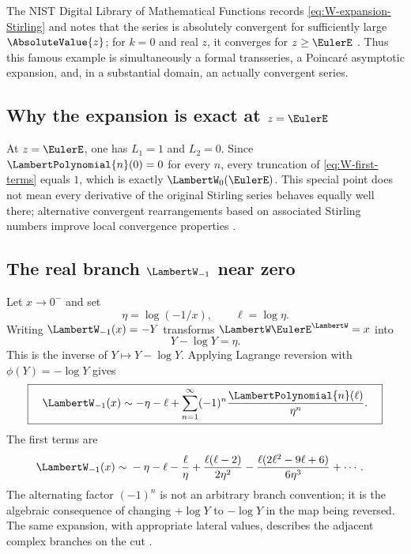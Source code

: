 \documentclass[11pt]{article}
\theoremstyle{pltheorem}
\begin{document}
The NIST Digital Library of Mathematical Functions records
\cref{eq:W-expansion-Stirling} and notes that the series is absolutely convergent for sufficiently large \(\AbsoluteValue{z}\); for \(k=0\) and real \(z\), it converges for \(z\ge\EulerE\) \cite{dlmf-W}.  Thus this famous example is simultaneously a formal transseries, a Poincar\'e asymptotic expansion, and, in a substantial domain, an actually convergent series.

\subsection{\texorpdfstring{Why the expansion is exact at \(z=\EulerE\)}{Why the expansion is exact at z = e}}

At \(z=\EulerE\), one has \(L_1=1\) and \(L_2=0\).  Since
\(\LambertPolynomial{n}(0)=0\) for every \(n\), every truncation of
\cref{eq:W-first-terms} equals \(1\), which is exactly
\(\LambertW_0(\EulerE)\).  This special point does not mean every derivative of the original Stirling series behaves equally well there; alternative convergent rearrangements based on associated Stirling numbers improve local convergence properties \cite{jeffrey-et-al-1995}.

\subsection{\texorpdfstring{The real branch \(\LambertW_{-1}\) near zero}{The real branch W-1 near zero}}

Let \(x\to0^-\) and set
\begin{equation}\label{eq:eta-def}
 \eta=\log(-1/x),
 \qquad
 \ell=\log\eta.
\end{equation}
Writing \(\LambertW_{-1}(x)=-Y\) transforms
\(\LambertW\EulerE^\LambertW=x\) into
\begin{equation}\label{eq:Y-minus-logY}
 Y-\log Y=\eta.
\end{equation}
This is the inverse of \(Y\mapsto Y-\log Y\).  Applying Lagrange reversion with \(\phi(Y)=-\log Y\) gives
\begin{equation}\label{eq:Wminus1-expansion}
 \boxed{\quad
 \LambertW_{-1}(x)\sim-\eta-\ell
 +\sum_{n=1}^{\infty}(-1)^n\frac{\LambertPolynomial{n}(\ell)}{\eta^n}.
 \quad}
\end{equation}
The first terms are
\begin{align}
 \LambertW_{-1}(x)\sim{}&-\eta-\ell-\frac{\ell}{\eta}
 +\frac{\ell(\ell-2)}{2\eta^2}
 -\frac{\ell(2\ell^2-9\ell+6)}{6\eta^3}
 +\cdots.
 \label{eq:Wminus1-first}
\end{align}
The alternating factor \((-1)^n\) is not an arbitrary branch convention; it is the algebraic consequence of changing \(+\log Y\) to \(-\log Y\) in the map being reversed.  The same expansion, with appropriate lateral values, describes the adjacent complex branches on the cut \cite{dlmf-W,corless-et-al-1996}.
\end{document}
